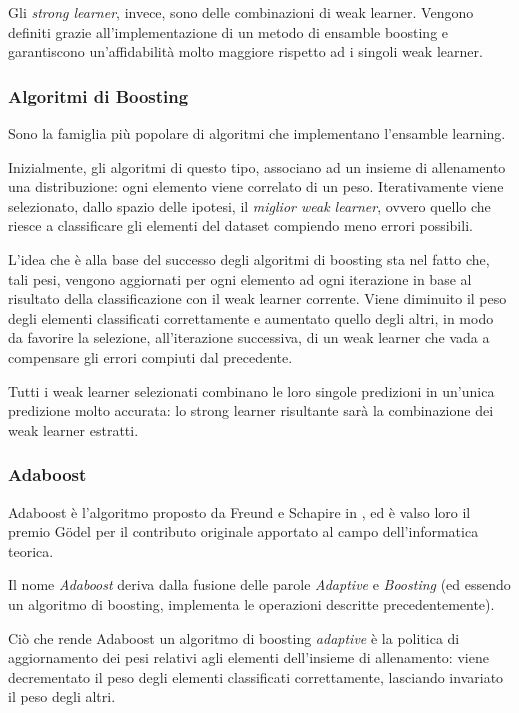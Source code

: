                 Gli \emph{strong learner}, invece, sono delle combinazioni di weak learner.
                Vengono definiti grazie all'implementazione di un metodo di ensamble boosting e garantiscono un'affidabilità molto maggiore rispetto ad i singoli weak learner.

            \subsubsection{Algoritmi di Boosting}
            \label{subsub:boostin_alg}
                Sono la famiglia più popolare di algoritmi che implementano l'ensamble learning.

                Inizialmente, gli algoritmi di questo tipo, associano ad un insieme di allenamento una distribuzione: ogni elemento viene correlato di un peso.
                Iterativamente viene selezionato, dallo spazio delle ipotesi, il \emph{miglior weak learner}, ovvero quello che riesce a classificare gli elementi del dataset compiendo meno errori possibili.

                L'idea che è alla base del successo degli algoritmi di boosting sta nel fatto che, tali pesi, vengono aggiornati per ogni elemento ad ogni iterazione in base al risultato della classificazione con il weak learner corrente. 
                Viene diminuito il peso degli elementi classificati correttamente e aumentato quello degli altri, in modo da favorire la selezione, all'iterazione successiva, di un weak learner che vada a compensare gli errori compiuti dal precedente.

                Tutti i weak learner selezionati combinano le loro singole predizioni in un'unica predizione molto accurata: lo strong learner risultante sarà la combinazione dei weak learner estratti.

            \subsubsection{Adaboost}
                Adaboost è l'algoritmo proposto da Freund e Schapire in \cite{Freund97}, ed è valso loro il premio Gödel per il contributo originale apportato al campo dell'informatica teorica.

                Il nome \emph{Adaboost} deriva dalla fusione delle parole \emph{Adaptive} e \emph{Boosting} (ed essendo un algoritmo di boosting, implementa le operazioni descritte precedentemente).

                Ciò che rende Adaboost un algoritmo di boosting \emph{adaptive} è la politica di aggiornamento dei pesi relativi agli elementi dell'insieme di allenamento: viene decrementato il peso degli elementi classificati correttamente, lasciando invariato il peso degli altri.

